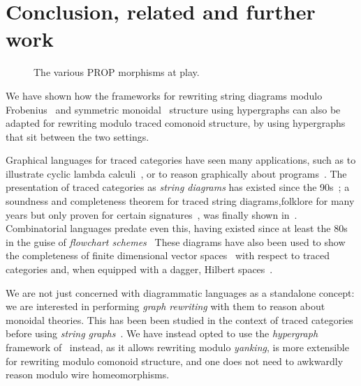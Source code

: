 \section{Conclusion, related and further work}

\begin{figure}
    \centering
    
    \caption{The various PROP morphisms at play.}
    \label{fig:roadmap}
\end{figure}

We have shown how the frameworks for rewriting string diagrams modulo
Frobenius~\cite{bonchi2022string} and symmetric
monoidal~\cite{bonchi2022stringa} structure using hypergraphs can also be
adapted for rewriting modulo traced comonoid structure, by using
hypergraphs that sit between the two settings.

Graphical languages for traced categories have seen many applications, such as
to illustrate cyclic lambda calculi~\cite{hasegawa1997recursion}, or to reason
graphically about programs~\cite{schweimeier1999categorical}.
The presentation of traced categories as \emph{string diagrams} has existed
since the 90s~\cite{joyal1991geometry,joyal1996traced}; a soundness and
completeness theorem for traced string diagrams,folklore for many years
but only proven for certain signatures~\cite{selinger2011survey}, was finally
shown in~\cite{kissinger2014abstract}.
Combinatorial languages predate even this, having existed since at least the 80s
in the guise of
\emph{flowchart schemes}~\cite{stefanescu1990feedback,cazanescu1990new,cazanescu1994feedback}
These diagrams have also been used to show the completeness of finite dimensional
vector spaces~\cite{hasegawa2008finite} with respect to traced categories and,
when equipped with a dagger, Hilbert spaces~\cite{selinger2012finite}.

We are not just concerned with diagrammatic languages as a standalone concept:
we are interested in performing \emph{graph rewriting} with them to reason about
monoidal theories.
This has been been studied in the context of traced categories before using
\emph{string graphs}~\cite{kissinger2012pictures,dixon2013opengraphs}.
We have instead opted to use the \emph{hypergraph} framework
of~\cite{bonchi2022string,bonchi2022stringa,bonchi2022stringb} instead, as it
allows rewriting modulo \emph{yanking}, is more extensible for rewriting modulo
comonoid structure, and one does not need to awkwardly reason modulo wire
homeomorphisms.

